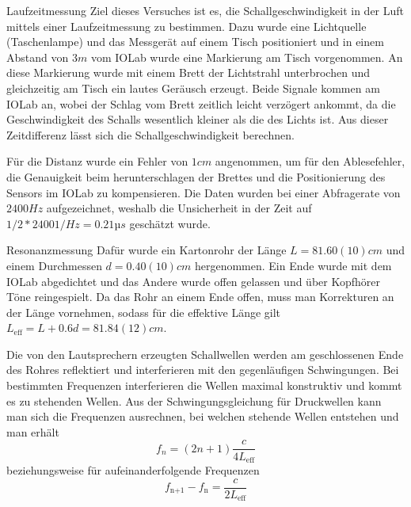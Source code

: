 \documentclass{alex_gp}
\begin{document}
\begin{mybox}{Laufzeitmessung}
	Ziel dieses Versuches ist es, die Schallgeschwindigkeit in der Luft mittels einer Laufzeitmessung zu bestimmen. Dazu wurde eine Lichtquelle (Taschenlampe) und das Messgerät auf einem Tisch positioniert und in einem Abstand von \( 3 \unit{m} \) vom IOLab wurde eine Markierung am Tisch vorgenommen. An diese Markierung wurde mit einem Brett der Lichtstrahl unterbrochen und gleichzeitig am Tisch ein lautes Geräusch erzeugt. Beide Signale kommen am IOLab an, wobei der Schlag vom Brett zeitlich leicht verzögert ankommt, da die Geschwindigkeit des Schalls wesentlich kleiner als die des Lichts ist. Aus dieser Zeitdifferenz lässt sich die Schallgeschwindigkeit berechnen. 
	
	Für die Distanz wurde ein Fehler von \( 1 \unit{cm} \) angenommen, um für den Ablesefehler, die Genauigkeit beim herunterschlagen der Brettes und die Positionierung des Sensors im IOLab zu kompensieren. Die Daten wurden bei einer Abfragerate von \( 2400 \unit{Hz} \) aufgezeichnet, weshalb die Unsicherheit in der Zeit auf \( 1/2*2400 \unit{1/Hz} = 0.21 \unit{µs} \) geschätzt wurde.
\end{mybox}

\begin{mybox}{Resonanzmessung}
	Dafür wurde ein Kartonrohr der Länge \( L = 81.60(10) \unit{cm} \) und einem Durchmessen \( d = 0.40(10) \unit{cm} \) hergenommen. Ein Ende wurde mit dem IOLab abgedichtet und das Andere wurde offen gelassen und über Kopfhörer Töne reingespielt. Da das Rohr an einem Ende offen, muss man Korrekturen an der Länge vornehmen, sodass für die effektive Länge gilt \( L_{\text{eff}} = L + 0.6d = 81.84(12) \unit{cm} \).
	
	Die von den Lautsprechern erzeugten Schallwellen werden am geschlossenen Ende des Rohres reflektiert und interferieren mit den gegenläufigen Schwingungen. Bei bestimmten Frequenzen interferieren die Wellen maximal konstruktiv und kommt es zu stehenden Wellen. Aus der Schwingungsgleichung für Druckwellen kann man sich die Frequenzen ausrechnen, bei welchen stehende Wellen entstehen und man erhält
	\begin{equation}\label{key}
		f_n = (2n+1)\frac{c}{4L_{\text{eff}}}
	\end{equation}
    beziehungsweise für aufeinanderfolgende Frequenzen
    \begin{equation}\label{key}
    	f_{\text{n+1}} - f_{\text{n}} = \frac{c}{2L_{\text{eff}}}
    \end{equation}
\end{mybox}
\end{document}
